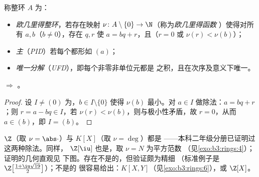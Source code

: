 \begin{definition}\label{def:b3:rings:pidufd}
称整环 $A$ 为：
\begin{itemize}
  \item \emph{欧几里得整环}，若存在映射
        $\nu \colon A \setminus \{0\} \to \N$（称为\emph{欧几里得函数
        }）使得对所有 $a, b$（$b \ne 0$），存在
        $q, r$ 使 $a = bq + r$，且（$r = 0$ 或 $\nu(r) <
        \nu(b)$）；
  \item \emph{主}（\emph{PID}）若每个都形如 $(a)$；
  \item \emph{唯一分解}（\emph{UFD}），即每个非零非单位元都是
        之积，且在次序及意义下唯一。
\end{itemize}
\end{definition}

\begin{theorem}\label{thm:b3:rings:euclideanpid}
 $\Rightarrow$ 。
\end{theorem}

\begin{proof}
设 $I \neq (0)$ 为，$b \in I \setminus\{0\}$ 使得
$\nu(b)$ 最小。对 $a \in I$ 做除法：$a = bq + r$；则 $r = a
- bq \in I$，若 $\nu(r) < \nu(b)$，则与极小性矛盾，故
$r = 0$，从而 $a \in (b)$，即 $I = (b)$。
\end{proof}

\begin{example}\label{ex:b3:rings:euclidean}
$\Z$（取 $\nu = \abs\cdot$）与 $K[X]$（取 $\nu = \deg$）都是
——本科二年级分册已证明过这两种除法。同样，
$\Z[\iu]$ 也是，取 $\nu = N$ 为平方范数
（见\cref{exo:b3:rings:4}）；证明的几何直观见
下图。存在不是的，但验证颇为精细
（标准例子是
$\Z\bigl[\frac{1+\iu\sqrt{19}}2\bigr]$）；不是的
很容易给出：$K[X, Y]$（见\cref{exo:b3:rings:6}），或 $\Z[X]$。
\end{example}

